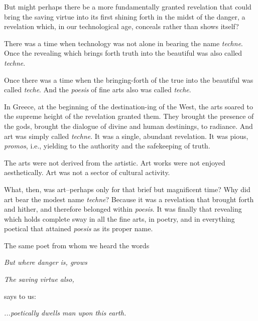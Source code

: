\documentclass[paper=a4, fontsize=11pt,twoside]{scrartcl}
\begin{document}
But might perhaps there be a more fundamentally granted revelation that could bring the saving virtue into its first shining forth in the midst of the danger, a revelation which, in our technological age, conceals rather than shows itself?

There was a time when technology was not alone in bearing the name \textit{techn{\-e}}. Once the revealing which brings forth truth into the beautiful was also called \textit{techn{\-e}}.

Once there was a time when the bringing-forth of the true into the beautiful was called \textit{tech{\-e}}. And the \textit{po{\-e}sis} of fine arts also was called \textit{tech{\-e}}.

In Greece, at the beginning of the destination-ing of the West, the arts soared to the supreme height of the revelation granted them. They brought the presence of the gods, brought the dialogue of divine and human destinings, to radiance. And art was simply called \textit{techn{\-e}}. It was a single, abundant revelation. It was pious, \textit{promos}, i.e., yielding to the authority and the safekeeping of truth.

The arts were not derived from the artistic. Art works were not enjoyed aesthetically. Art was not a sector of cultural activity.

What, then, was art--perhaps only for that brief but magnificent time? Why did art bear the modest name \textit{techn{\-e}}? Because it was a revelation that brought forth and hither, and therefore belonged within \textit{po{\-e}sis}. It was finally that revealing which holds complete sway in all the fine arts, in poetry, and in everything poetical that attained \textit{po{\-e}sis} as its proper name.

The same poet from whom we heard the words
\vspace{5mm}

\begin{center}
\textit{But where danger is, grows}

\textit{The saving virtue also,}
\end{center}

\vspace{5mm}

says to us:

\vspace{5mm}

\begin{center}
\textit{...poetically dwells man upon this earth.}
\end{center}
\end{document}
